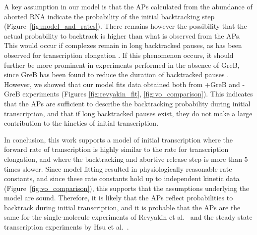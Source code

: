A key assumption in our model is that the APs calculated from the abundance of
aborted RNA indicate the probability of the initial backtracking step
(Figure~\ref{fig:model_and_rates}). There remains however the possibility that
the actual probability to backtrack is higher than what is observed from the
APs. This would occur if complexes remain in long backtracked
pauses, as has been observed for transcription elongation
\cite{shaevitz_backtracking_2003}. If this phenomenon occurs, it should further
be more prominent in experiments performed in the absence of GreB, since GreB
has been found to reduce the duration of backtracked pauses
\cite{shaevitz_backtracking_2003}. However, we showed that our model fits data
obtained both from +GreB and -GreB experiments (Figures
\ref{fig:revyakin_fit}, \ref{fig:vo_comparison}). This indicates that the APs
are sufficient to describe the backtracking probability during initial
transcription, and that if long backtracked pauses exist, they do not make a
large contribution to the kinetics of initial transcription.

In conclusion, this work supports a model of initial transcription where the
forward rate of transcription is highly similar to the rate for transcription
elongation, and where the backtracking and abortive release step is more than
5 times slower. Since model fitting resulted in physiologically reasonable
rate constants, and since these rate constants hold up to independent kinetic
data (Figure~\ref{fig:vo_comparison}), this supports that the assumptions
underlying the model are sound. Therefore, it is likely that the APs reflect
probabilities to backtrack during initial transcription, and it is probable
that the APs are the same for the single-molecule experiments of Revyakin et
al.\ \cite{revyakin_abortive_2006} and the steady state transcription
experiments by Hsu et al.\ \cite{hsu_initial_2006}.
 
